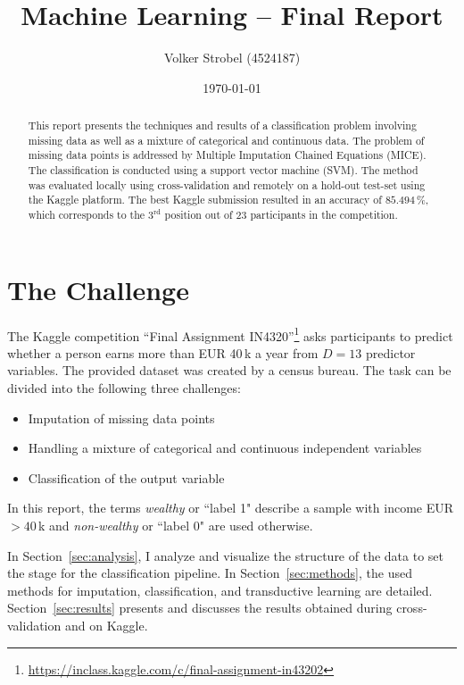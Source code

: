\documentclass[a4paper]{article}
\begin{document}
\title{Machine Learning -- Final Report}

\author{Volker Strobel (4524187)}

\date{\today}

\maketitle

\begin{abstract}
  This report presents the techniques and results of a classification
  problem involving missing data as well as a mixture of categorical
  and continuous data. The problem of missing data points is addressed
  by Multiple Imputation Chained Equations (MICE). The classification is
  conducted using a support vector machine (SVM). The method was
  evaluated locally using cross-validation and remotely on a hold-out
  test-set using the Kaggle platform. The best Kaggle submission
  resulted in an accuracy of $85.494\,\%$, which corresponds to the
  $3^{\text{rd}}$ position out of $23$ participants in the
  competition.%
\end{abstract}%
\section{The Challenge}
\label{sec:introduction}

The Kaggle competition ``Final Assignment
IN4320''\footnote{\url{https://inclass.kaggle.com/c/final-assignment-in43202}}
asks participants to predict whether a person earns more than EUR 40\,k
a year from $D = 13$ predictor variables. The provided dataset was
created by a census bureau. The task can be divided into the following
three challenges:

\begin{itemize}
\item Imputation of missing data points
\item Handling a mixture of categorical and continuous independent variables
\item Classification of the output variable
\end{itemize}

In this report, the terms \emph{wealthy} or ``label 1" describe a
sample with income EUR $>40\,$k and \emph{non-wealthy} or ``label 0"
are used otherwise.

In Section~\ref{sec:analysis}, I analyze and visualize the structure
of the data to set the stage for the classification pipeline. In
Section~\ref{sec:methods}, the used methods for imputation,
classification, and transductive learning are
detailed. Section~\ref{sec:results} presents and discusses the results
obtained during cross-validation and on Kaggle.
\end{document}

